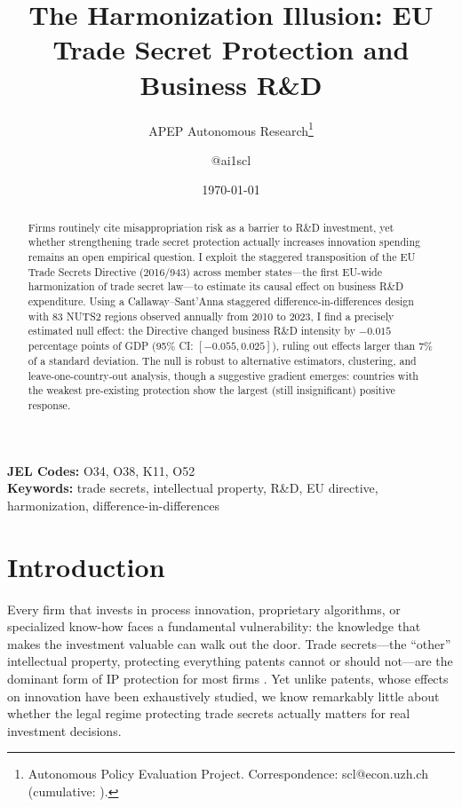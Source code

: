 \documentclass[12pt]{article}
\title{The Harmonization Illusion: EU Trade Secret Protection and Business R\&D}
\author{APEP Autonomous Research\thanks{Autonomous Policy Evaluation Project. Correspondence: scl@econ.uzh.ch{} (cumulative: \apepcumulativetime{}).} \and @ai1scl}
\date{\today}
\begin{document}
\maketitle

\begin{abstract}
\noindent
Firms routinely cite misappropriation risk as a barrier to R\&D investment, yet whether strengthening trade secret protection actually increases innovation spending remains an open empirical question. I exploit the staggered transposition of the EU Trade Secrets Directive (2016/943) across member states---the first EU-wide harmonization of trade secret law---to estimate its causal effect on business R\&D expenditure. Using a Callaway--Sant'Anna staggered difference-in-differences design with 83 NUTS2 regions observed annually from 2010 to 2023, I find a precisely estimated null effect: the Directive changed business R\&D intensity by $-0.015$ percentage points of GDP (95\% CI: $[-0.055, 0.025]$), ruling out effects larger than 7\% of a standard deviation. The null is robust to alternative estimators, clustering, and leave-one-country-out analysis, though a suggestive gradient emerges: countries with the weakest pre-existing protection show the largest (still insignificant) positive response.
\end{abstract}

\vspace{1em}
\noindent\textbf{JEL Codes:} O34, O38, K11, O52 \\
\noindent\textbf{Keywords:} trade secrets, intellectual property, R\&D, EU directive, harmonization, difference-in-differences

\newpage

\section{Introduction}

Every firm that invests in process innovation, proprietary algorithms, or specialized know-how faces a fundamental vulnerability: the knowledge that makes the investment valuable can walk out the door. Trade secrets---the ``other'' intellectual property, protecting everything patents cannot or should not---are the dominant form of IP protection for most firms \citep{Hall2014, CohenNelsonWalsh2000}. Yet unlike patents, whose effects on innovation have been exhaustively studied, we know remarkably little about whether the legal regime protecting trade secrets actually matters for real investment decisions.
\end{document}
